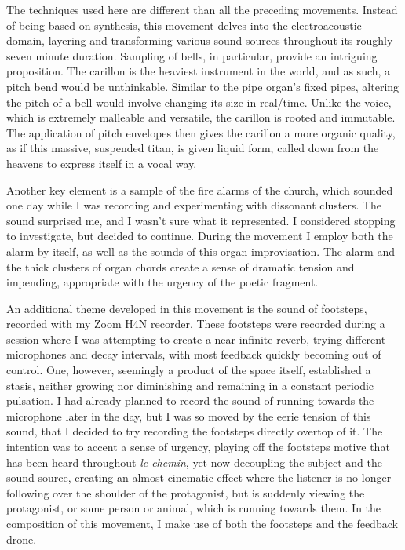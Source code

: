 \documentclass[12pt,twoside,maitrise]{dms_ks}
\theoremstyle{definition}
\begin{document}
{{The techniques used here are different than all the preceding movements. 
Instead of being based on synthesis, this movement delves into the electroacoustic domain, layering and transforming various sound sources throughout its roughly seven minute duration. 
Sampling of bells, in particular, provide an intriguing proposition. 
The carillon is the heaviest instrument in the world, and as such, a pitch bend would be unthinkable. 
Similar to the pipe organ's fixed pipes, altering the pitch of a bell would involve changing its size in real\=/time. 
Unlike the voice, which is extremely malleable and versatile, the carillon is rooted and immutable. 
The application of pitch envelopes then gives the carillon a more organic quality, as if this massive, suspended titan, is given liquid form, called down from the heavens to express itself in a vocal way.

Another key element is a sample of the fire alarms of the church, which sounded one day while I was recording and experimenting with dissonant clusters. 
The sound surprised me, and I wasn’t sure what it represented. 
I considered stopping to investigate, but decided to continue. 
During the movement I employ both the alarm by itself, as well as the sounds of this organ improvisation.
The alarm and the thick clusters of organ chords create a sense of dramatic tension and impending, appropriate with the urgency of the poetic fragment. 

An additional theme developed in this movement is the sound of footsteps, recorded with my Zoom H4N recorder. 
These footsteps were recorded during a session where I was attempting to create a near-infinite reverb, trying different microphones and decay intervals, with most feedback quickly becoming out of control. 
One, however, seemingly a product of the space itself, established a stasis, neither growing nor diminishing and remaining in a constant periodic pulsation. 
I had already planned to record the sound of running towards the microphone later in the day, but I was so moved by the eerie tension of this sound, that I decided to try recording the footsteps directly overtop of it. 
The intention was to accent a sense of urgency, playing off the footsteps motive that has been heard throughout \textit{le chemin}, yet now decoupling the subject and the sound source, creating an almost cinematic effect where the listener is no longer following over the shoulder of the protagonist, but is suddenly viewing the protagonist, or some person or animal, which is running towards them. 
In the composition of this movement, I make use of both the footsteps and the feedback drone.

}}
\end{document}
